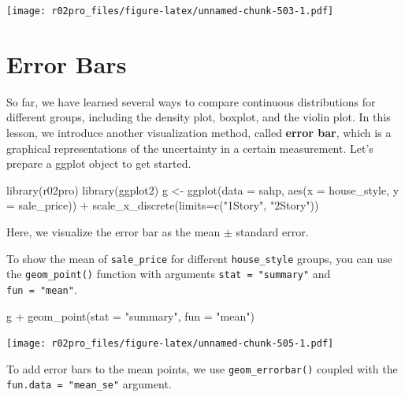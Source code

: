\documentclass[
]{book}
\newenvironment{Shaded}{\begin{snugshade}}{\end{snugshade}}
\newcommand{\AttributeTok}[1]{\textcolor[rgb]{0.77,0.63,0.00}{#1}}
\newcommand{\FunctionTok}[1]{\textcolor[rgb]{0.00,0.00,0.00}{#1}}
\newcommand{\NormalTok}[1]{#1}
\newcommand{\OtherTok}[1]{\textcolor[rgb]{0.56,0.35,0.01}{#1}}
\newcommand{\SpecialCharTok}[1]{\textcolor[rgb]{0.00,0.00,0.00}{#1}}
\newcommand{\StringTok}[1]{\textcolor[rgb]{0.31,0.60,0.02}{#1}}
\begin{document}
\texttt{[image: r02pro\_files/figure-latex/unnamed-chunk-503-1.pdf]}

\hypertarget{errorbar}{%
\section{Error Bars}\label{errorbar}}

So far, we have learned several ways to compare continuous distributions for different groups, including the density plot, boxplot, and the violin plot. In this lesson, we introduce another visualization method, called \textbf{error bar}, which is a graphical representations of the uncertainty in a certain measurement. Let's prepare a ggplot object to get started.

\begin{Shaded}
\begin{Highlighting}[]
\FunctionTok{library}\NormalTok{(r02pro)}
\FunctionTok{library}\NormalTok{(ggplot2)}
\NormalTok{g }\OtherTok{\textless{}{-}} \FunctionTok{ggplot}\NormalTok{(}\AttributeTok{data =}\NormalTok{ sahp, }\FunctionTok{aes}\NormalTok{(}\AttributeTok{x =}\NormalTok{ house\_style, }\AttributeTok{y =}\NormalTok{ sale\_price)) }\SpecialCharTok{+} 
  \FunctionTok{scale\_x\_discrete}\NormalTok{(}\AttributeTok{limits=}\FunctionTok{c}\NormalTok{(}\StringTok{"1Story"}\NormalTok{, }\StringTok{"2Story"}\NormalTok{))}
\end{Highlighting}
\end{Shaded}

Here, we visualize the error bar as the mean \(\pm\) standard error.

To show the mean of \texttt{sale\_price} for different \texttt{house\_style} groups, you can use the \texttt{geom\_point()} function with arguments \texttt{stat\ =\ "summary"} and \texttt{fun\ =\ "mean"}.

\begin{Shaded}
\begin{Highlighting}[]
\NormalTok{g  }\SpecialCharTok{+} \FunctionTok{geom\_point}\NormalTok{(}\AttributeTok{stat =} \StringTok{"summary"}\NormalTok{, }\AttributeTok{fun =} \StringTok{"mean"}\NormalTok{)}
\end{Highlighting}
\end{Shaded}

\texttt{[image: r02pro\_files/figure-latex/unnamed-chunk-505-1.pdf]}

To add error bars to the mean points, we use \texttt{geom\_errorbar()} coupled with the \texttt{fun.data\ =\ "mean\_se"} argument.
\end{document}
